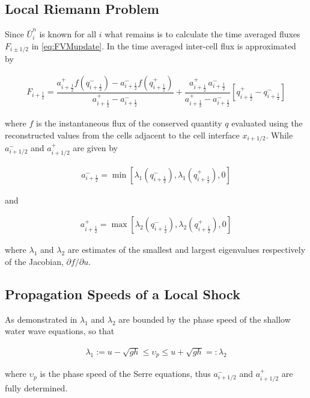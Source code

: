 \documentclass[SingleSpace,12pt,Proceedings]{Serre_ASCE}
\begin{document}
\subsection{Local Riemann Problem} %
Since $\bar{U}^{n}_i$ is known for all $i$ what remains is to calculate the time averaged fluxes $F_{i \pm 1/2}$ in \eqref{eq:FVMupdate}. In  the time averaged inter-cell flux is approximated by
\begin{linenomath*}
\begin{gather}\label{eq:HLL_flux}
F_{i+\frac{1}{2}} = \dfrac{a^+_{i+\frac{1}{2}} f\left(q^-_{i+\frac{1}{2}}\right) - a^-_{i+\frac{1}{2}} f\left(q^+_{i+\frac{1}{2}}\right)}{a^+_{i+\frac{1}{2}} - a^-_{i+\frac{1}{2}}}  + \dfrac{a^+_{i+\frac{1}{2}} \, a^-_{i+\frac{1}{2}}}{a^+_{i+\frac{1}{2}} - a^-_{i+\frac{1}{2}}} \left [ q^+_{i+\frac{1}{2}} - q^-_{i+\frac{1}{2}} \right ]
\end{gather}
\end{linenomath*}
where $f$ is the instantaneous flux of the conserved quantity $q$ evaluated using the reconstructed values from the cells adjacent to the cell interface $x_{i + 1/2}$. While $a^-_{i+1/2}$ and $a^+_{i+1/2}$ are given by
\begin{linenomath*}
\begin{gather*}
a^-_{i+\frac{1}{2}} = \min \left[\lambda_1\left(q^-_{i + \frac{1}{2}}\right), \lambda_1\left(q^+_{i + \frac{1}{2}}\right), 0 \right]
\end{gather*}
\end{linenomath*}
and
\begin{linenomath*}
\begin{gather*}
a^+_{i+\frac{1}{2}} = \max \left[\lambda_2\left(q^-_{i + \frac{1}{2}}\right), \lambda_2\left(q^+_{i + \frac{1}{2}}\right), 0 \right]
\end{gather*}
\end{linenomath*}
where $\lambda_1$ and $\lambda_2$ are estimates of the smallest and largest eigenvalues respectively of the Jacobian, $\partial f / \partial u$.
\subsection{Propagation Speeds of a Local Shock} %
As demonstrated in  $\lambda_1$ and $\lambda_2$ are bounded by the phase speed of the shallow water wave equations, so that
\begin{linenomath*}
\begin{gather*}
 \lambda_1 := u - \sqrt{gh} \le \upsilon_p \le u + \sqrt{gh} =: \lambda_2
\end{gather*}
\end{linenomath*}
where $\upsilon_p$ is the phase speed of the Serre equations, thus $a^-_{i+1/2}$ and $a^+_{i+1/2}$ are fully determined.
\end{document}
